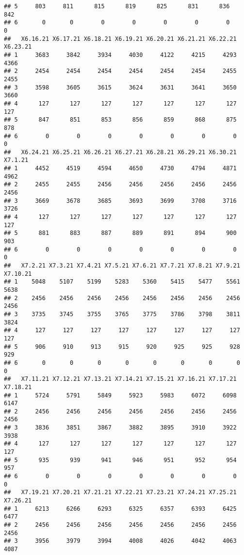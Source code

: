\documentclass[
]{article}
\begin{document}
\begin{verbatim}
## 5     803     811      815      819      825      831      836      842
## 6       0       0        0        0        0        0        0        0
##   X6.16.21 X6.17.21 X6.18.21 X6.19.21 X6.20.21 X6.21.21 X6.22.21 X6.23.21
## 1     3683     3842     3934     4030     4122     4215     4293     4366
## 2     2454     2454     2454     2454     2454     2454     2455     2455
## 3     3598     3605     3615     3624     3631     3641     3650     3660
## 4      127      127      127      127      127      127      127      127
## 5      847      851      853      856      859      868      875      878
## 6        0        0        0        0        0        0        0        0
##   X6.24.21 X6.25.21 X6.26.21 X6.27.21 X6.28.21 X6.29.21 X6.30.21 X7.1.21
## 1     4452     4519     4594     4650     4730     4794     4871    4962
## 2     2455     2455     2456     2456     2456     2456     2456    2456
## 3     3669     3678     3685     3693     3699     3708     3716    3726
## 4      127      127      127      127      127      127      127     127
## 5      881      883      887      889      891      894      900     903
## 6        0        0        0        0        0        0        0       0
##   X7.2.21 X7.3.21 X7.4.21 X7.5.21 X7.6.21 X7.7.21 X7.8.21 X7.9.21 X7.10.21
## 1    5048    5107    5199    5283    5360    5415    5477    5561     5638
## 2    2456    2456    2456    2456    2456    2456    2456    2456     2456
## 3    3735    3745    3755    3765    3775    3786    3798    3811     3824
## 4     127     127     127     127     127     127     127     127      127
## 5     906     910     913     915     920     925     925     928      929
## 6       0       0       0       0       0       0       0       0        0
##   X7.11.21 X7.12.21 X7.13.21 X7.14.21 X7.15.21 X7.16.21 X7.17.21 X7.18.21
## 1     5724     5791     5849     5923     5983     6072     6098     6147
## 2     2456     2456     2456     2456     2456     2456     2456     2456
## 3     3836     3851     3867     3882     3895     3910     3922     3938
## 4      127      127      127      127      127      127      127      127
## 5      935      939      941      946      951      952      954      957
## 6        0        0        0        0        0        0        0        0
##   X7.19.21 X7.20.21 X7.21.21 X7.22.21 X7.23.21 X7.24.21 X7.25.21 X7.26.21
## 1     6213     6266     6293     6325     6357     6393     6425     6477
## 2     2456     2456     2456     2456     2456     2456     2456     2456
## 3     3956     3979     3994     4008     4026     4042     4063     4087

\end{verbatim}
\end{document}
